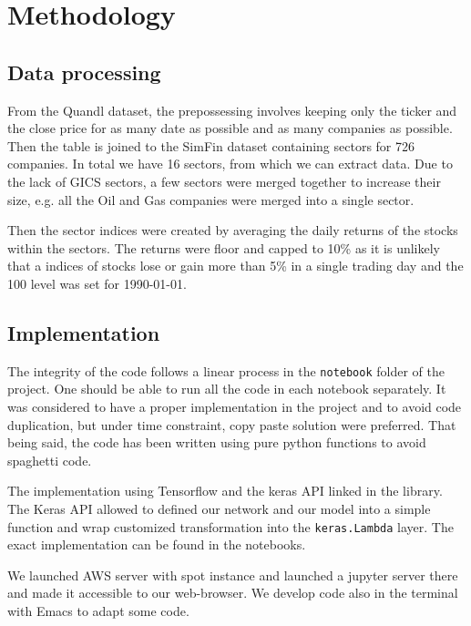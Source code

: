 \documentclass[a4paper,twoside]{article}
\begin{document}
\section{Methodology}
\label{sec:org8336ba7}

\subsection{Data processing}
\label{sec:org34e4d70}

From the Quandl dataset, the prepossessing involves keeping only the ticker
and the close price for as many date as possible and as many companies as
possible. Then the table is joined to the SimFin dataset containing sectors
for 726 companies. In total we have 16 sectors, from which we can extract
data. Due to the lack of GICS sectors, a few sectors were merged together to
increase their size, e.g. all the Oil and Gas companies were merged into a
single sector.

Then the sector indices were created by averaging the daily returns of the
stocks within the sectors. The returns were floor and capped to 10\% as it is
unlikely that a indices of stocks lose or gain more than 5\% in a single
trading day and the 100 level was set for 1990-01-01.

\subsection{Implementation}
\label{sec:orgbae949e}

The integrity of the code follows a linear process in the \texttt{notebook} folder
of the project. One should be able to run all the code in each notebook
separately. It was considered to have a proper implementation in the project
and to avoid code duplication, but under time constraint, copy paste solution
were preferred. That being said, the code has been written using pure python
functions to avoid spaghetti code.

The implementation using Tensorflow and the keras API linked in the library.
The Keras API allowed to defined our network and our model into a simple
function and wrap customized transformation into the \texttt{keras.Lambda} layer.
The exact implementation can be found in the notebooks.

We launched AWS server with spot instance and launched a jupyter server there
and made it accessible to our web-browser. We develop code also in the
terminal with Emacs to adapt some code. 
\end{document}
